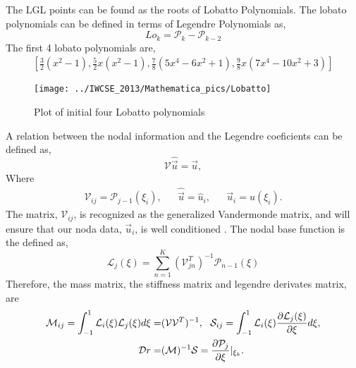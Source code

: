 \begin{frame}
	The LGL points can be found as the roots of Lobatto Polynomials. The lobato polynomials can be defined in terms of Legendre Polynomials as,
	\begin{equation}
		Lo_k = \mathcal{P}_{k}-\mathcal{P}_{k-2}
	\end{equation}
	The first 4 lobato polynomials are,
	\begin{align*}
		\left[\frac{3}{2} \left(x^2-1\right), 
		\frac{5}{2} x \left(x^2-1\right), 
		\frac{7}{8} \left(5 x^4-6 x^2+1\right), 
		\frac{9}{8} x \left(7 x^4-10 x^2+3\right)\right]
	\end{align*}
	\begin{figure}
		\centering
		\texttt{[image: ../IWCSE\_2013/Mathematica\_pics/Lobatto]}
		\caption{Plot of initial four Lobatto polynomials}
    \label{fig:Lobatto_polynomials}
	\end{figure}
\end{frame}

\begin{frame}
	A relation between the nodal information and the Legendre coeficients can be defined as,
	\begin{equation}
		\mathcal{V}\hat{\vec{u}} = \vec{u},
	\end{equation}
	Where 
	\begin{align}
		&\mathcal{V}_{ij} = \mathcal{P}_{j-1}(\xi_i),& 
		&\hat{\vec{u}}=\hat{u}_i,& 
		&\vec{u}_i=u(\xi_i).&
	\end{align}
	The matrix, $\mathcal{V}_{ij}$, is recognized as the generalized Vandermonde matrix, and will ensure that our noda data, $\vec{u}_i$, is well conditioned \cite{hesthaven2008nodal}. The nodal base function is the defined as,
	\begin{equation}
		\mathcal{L}_{j}(\xi) = \sum_{n=1}^K (\mathcal{V}^T_{jn})^{-1}\mathcal{P}_{n-1}(\xi)
	\end{equation}
	Therefore, the mass matrix, the stiffness matrix and legendre derivates matrix, are
	\begin{align}
		\mathcal{M}_{ij} = \int_{-1}^{1} \mathcal{L}_{i}(\xi)\mathcal{L}_{j}(\xi) d\xi =& (\mathcal{V}\mathcal{V}^T)^{-1}, 
		\:\:\:
		\mathcal{S}_{ij} = \int_{-1}^{1} \mathcal{L}_{i}(\xi)\frac{\partial \mathcal{L}_{j}(\xi)}{\partial \xi} d\xi, \\
		\mathcal{D}r =& (\mathcal{M})^{-1}\mathcal{S} = \frac{\partial \mathcal{P}_{j}}{\partial \xi}|_{\xi_k}.
	\end{align}
\end{frame}


